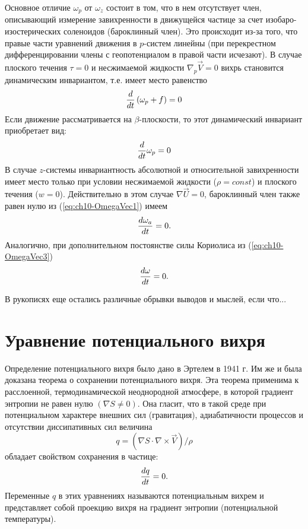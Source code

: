 Основное отличие $\omega_p$ от $\omega_z$ состоит в том, что в нем отсутствует член, описывающий измерение завихренности в движущейся частице за счет изобаро- изостерических соленоидов (бароклинный член). Это происходит из-за того, что правые части уравнений движения в $p$-систем линейны (при перекрестном дифференцировании члены с геопотенциалом в правой части исчезают). В случае плоского течения $\tau=0$ и несжимаемой жидкости $\nabla_p\vec{V}=0$ вихрь становится динамическим инвариантом, т.е. имеет место равенство
\begin{equation}
    \displaystyle\frac{d }{d t} \left( \omega_p + f \right) = 0
\end{equation}
Если движение рассматривается на $\beta$-плоскости, то этот динамический инвариант приобретает вид:
\begin{equation}
    \displaystyle\frac{d }{d t}\omega_p=0
\end{equation}
В случае $z$-системы инвариантность абсолютной и относительной завихренности имеет место только при условии несжимаемой жидкости ($\rho=const$) и плоского течения ($w=0$).  Действительно в этом случае $\nabla\vec{U}=0$, бароклинный член также равен нулю из (\ref{eq:ch10-OmegaVec1}) имеем
\begin{equation}
    \displaystyle\frac{d \omega_a}{d t}=0.
\end{equation}
Аналогично, при дополнительном постоянстве силы Кориолиса из (\ref{eq:ch10-OmegaVec3})
\begin{equation}
    \displaystyle\frac{d \omega}{d t}=0.
\end{equation}
\begin{warn}
    В рукописях еще остались различные обрывки выводов и мыслей, если что...
\end{warn}


\section{{\color{done}Уравнение потенциального вихря}}
Определение потенциального вихря было дано в Эртелем в 1941 г. Им же и была доказана теорема о сохранении потенциального вихря. Эта теорема применима к расслоенной, термодинамической неоднородной атмосфере, в которой градиент энтропии не равен нулю $(\nabla S\neq0)$. Она гласит, что в такой среде при потенциальном характере внешних сил (гравитация), адиабатичности процессов и отсутствии диссипативных сил величина
\begin{equation}
    \label{eq:ch10-q}
    q=\left( \nabla S\cdot\nabla\times\vec{V} \right)/\rho
\end{equation}
обладает свойством сохранения в частице:
\begin{equation}
    \label{eq:ch10-dqdt}
    \displaystyle\frac{d q}{d t}=0.
\end{equation}
Переменные $q$ в этих уравнениях называются потенциальным вихрем и представляет собой проекцию вихря на градиент энтропии (потенциальной температуры). 

